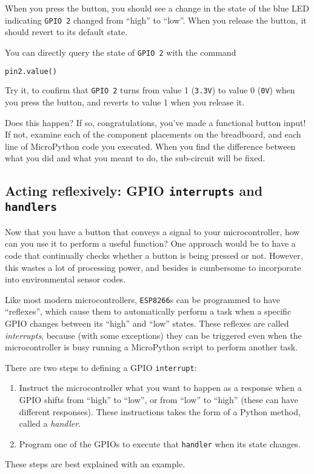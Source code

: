 \begin{enumerate}
	When you press the button, you should see a change in the state of the blue LED indicating \texttt{GPIO 2} changed from ``high'' to ``low''. 
	When you release the button, it should revert to its default state. 
	
	You can directly query the state of \texttt{GPIO 2} with the command
\begin{lstlisting}[language=Python]
pin2.value() 
\end{lstlisting}	
	Try it, to confirm that \texttt{GPIO 2} turns from value 1 (\texttt{3.3V}) to value 0 (\texttt{0V}) when you press the button, and reverts to value 1 when you release it.
	
\end{enumerate}
Does this happen? 
If so, congratulations, you've made a functional button input! 
If not, examine each of the component placements on the breadboard, and each line of MicroPython code you executed. 
When you find the difference between what you did and what you meant to do, the sub-circuit will be fixed.

\subsection{Acting reflexively: GPIO \texttt{interrupts} and \texttt{handlers}}
Now that you have a button that conveys a signal to your microcontroller, how can you use it to perform a useful function? 
One approach would be to have a code that continually checks whether a button is being pressed or not. 
However, this wastes a lot of processing power, and besides is cumbersome to incorporate into environmental sensor codes. 

Like most modern microcontrollers, \texttt{ESP8266}s can be programmed to have ``reflexes'', which cause them to automatically perform a task when a specific GPIO changes between its ``high'' and ``low'' states. 
These reflexes are called \emph{interrupts}, because (with some exceptions) they can be triggered even when the microcontroller is busy running a MicroPython script to perform another task. 

There are two steps to defining a GPIO \texttt{interrupt}:
\begin{enumerate}
	\item Instruct the microcontroller what you want to happen as a response when a GPIO shifts from ``high'' to ``low'', or from ``low'' to ``high'' (these can have different responses). 
	These instructions takes the form of a Python method, called a \emph{handler}. 
	
	\item Program one of the GPIOs to execute that \texttt{handler} when its state changes.

\end{enumerate}
These steps are best explained with an example. 

